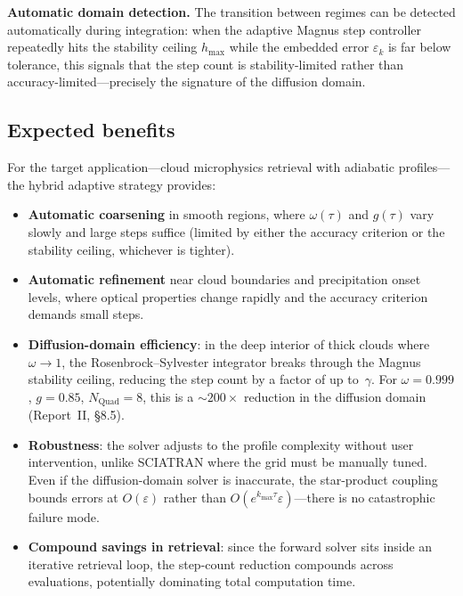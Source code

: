 \documentclass[11pt,a4paper]{article}
\theoremstyle{definition}
\begin{document}
\textbf{Automatic domain detection.}  The transition between regimes
can be detected automatically during integration: when the adaptive
Magnus step controller repeatedly hits the stability ceiling $h_{\max}$
while the embedded error $\varepsilon_k$ is far below tolerance, this
signals that the step count is stability-limited rather than
accuracy-limited---precisely the signature of the diffusion domain.

\subsection{Expected benefits}\label{sec:adapt_benefits}

For the target application---cloud microphysics retrieval with adiabatic
profiles---the hybrid adaptive strategy provides:
\begin{itemize}[nosep]
\item \textbf{Automatic coarsening} in smooth regions, where
  $\omega(\tau)$ and $g(\tau)$ vary slowly and large steps suffice
  (limited by either the accuracy criterion or the stability ceiling,
  whichever is tighter).
\item \textbf{Automatic refinement} near cloud boundaries and
  precipitation onset levels, where optical properties change rapidly
  and the accuracy criterion demands small steps.
\item \textbf{Diffusion-domain efficiency}: in the deep interior of
  thick clouds where $\omega\to 1$, the Rosenbrock--Sylvester integrator
  breaks through the Magnus stability ceiling, reducing the step count
  by a factor of up to~$\gamma$.  For $\omega=0.999$, $g=0.85$,
  $N_{\text{Quad}}=8$, this is a $\sim\!200\!\times$ reduction in the
  diffusion domain (Report~II, \S8.5).
\item \textbf{Robustness}: the solver adjusts to the profile complexity
  without user intervention, unlike SCIATRAN where the grid must be
  manually tuned.  Even if the diffusion-domain solver is inaccurate,
  the star-product coupling bounds errors at $O(\varepsilon)$ rather
  than $O(e^{k_{\max}\tau}\varepsilon)$---there is no catastrophic
  failure mode.
\item \textbf{Compound savings in retrieval}: since the forward solver
  sits inside an iterative retrieval loop, the step-count reduction
  compounds across evaluations, potentially dominating total computation
  time.
\end{itemize}


\end{document}
